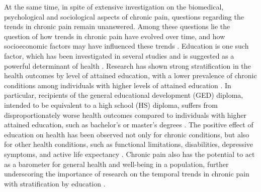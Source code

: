At the same time, in spite of extensive investigation on the biomedical, psychological and sociological aspects of chronic pain, questions regarding the trends in chronic pain remain unanswered. Among these questions lie the question of how trends in chronic pain have evolved over time, and how socioeconomic factors may have influenced these trends \citep{Zajacova2021-ee}. Education is one such factor, which has been investigated in several studies and is suggested as a powerful determinant of health \citep{mirowsky2017education}. Research has shown strong stratification in the health outcomes by level of attained education, with a lower prevalence of chronic conditions among individuals with higher levels of attained education \citep{dionne2001formal,kennedy2014prevalence}. In particular, recipients of the general educational development (GED) diploma, intended to be equivalent to a high school (HS) diploma, suffers from disproportionately worse health outcomes compared to individuals with higher attained education, such as bachelor's or master's degrees \citep{ZAJACOVA20201270}. The positive effect of education on health has been observed not only for chronic conditions, but also for other health conditions, such as functional limitations, disabilities, depressive symptoms, and active life expectancy \citep{montez2012educational,lorant2003socioeconomic,schoeni2005persistent}. Chronic pain also has the potential to act as a barometer for general health and well-being in a population, further underscoring the importance of research on the temporal trends in chronic pain with stratification by education \citep{sociology}.

